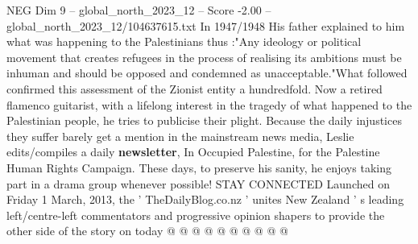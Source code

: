 \begin{textsample}{NEG Dim 9 – global\_north\_2023\_12 – Score -2.00 – global\_north\_2023\_12/104637615.txt}
In 1947/1948 His father explained to him what was happening to the Palestinians thus :"Any ideology or political movement that creates refugees in the process of realising its ambitions must be inhuman and should be opposed and condemned as unacceptable."What followed confirmed this assessment of the Zionist entity a hundredfold.
Now a retired flamenco guitarist, with a lifelong interest in the tragedy of what happened to the Palestinian people, he tries to publicise their plight.
Because the daily injustices they suffer barely get a mention in the mainstream news media, Leslie edits/compiles a daily \textbf{newsletter}, In Occupied Palestine, for the Palestine Human Rights Campaign.
These days, to preserve his sanity, he enjoys taking part in a drama group whenever possible!
STAY CONNECTED Launched on Friday 1 March, 2013, the ' TheDailyBlog.co.nz ' unites New Zealand ' s leading left/centre-left commentators and progressive opinion shapers to provide the other side of the story on today @ @ @ @ @ @ @ @ @ @

\end{textsample}
